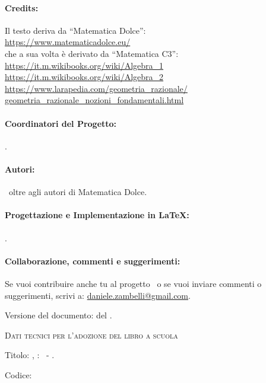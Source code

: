 {{\vspace{-1em}
\paragraph{Credits:} Il testo deriva da ``Matematica Dolce'':\\ 
\url{https://www.matematicadolce.eu/} \\
che a sua volta è derivato da
``Matematica C3'':\\
\url{https://it.m.wikibooks.org/wiki/Algebra_1} \\
\url{https://it.m.wikibooks.org/wiki/Algebra_2}\\
\url{https://www.larapedia.com/geometria_razionale/
geometria_razionale_nozioni_fondamentali.html}

\vspace{-1em}
\paragraph{Coordinatori del Progetto:} \coord.

\vspace{-1em}
\paragraph{Autori:} \autori\ oltre agli autori di Matematica Dolce.


\vspace{-1em}
\paragraph{Progettazione e Implementazione in \LaTeX:} 
          {\texcol}.

\vspace{-1em}
\paragraph{Collaborazione, commenti e suggerimenti:} 
Se vuoi contribuire anche tu al progetto \serie\ o se  vuoi inviare 
commenti o suggerimenti, scrivi a:
\href{mailto:daniele.zambelli@gmail.com}{daniele.zambelli@gmail.com}.

\vspace{2ex}
Versione del documento: {\docvers} del {\oggi}.


\vspace{2ex}
{\scshape{Dati tecnici per l'adozione del libro a scuola}}

Titolo: \serie, \tipo \numero: \titolo\ - \anno.

Codice: \mcisbn 



\cleardoublepage
}}
